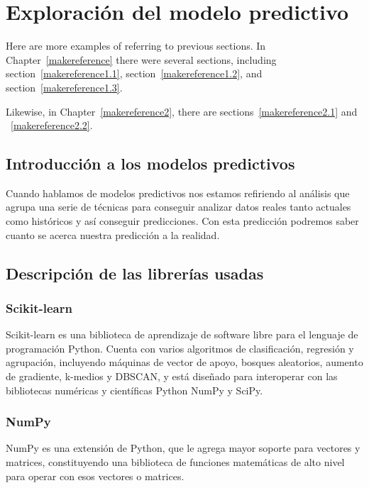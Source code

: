 
\cleardoublepage

\chapter{Exploración del modelo predictivo}
\label{makereference3}

Here are more examples of referring to previous sections.  In
Chapter~\ref{makereference} there were several sections, including
section~\ref{makereference1.1}, section~\ref{makereference1.2},
and section~\ref{makereference1.3}.

Likewise, in Chapter~\ref{makereference2}, there are
sections~\ref{makereference2.1} and ~\ref{makereference2.2}.

\section{Introducción a los modelos predictivos}
\label{makereference3.1}

Cuando hablamos de modelos predictivos nos estamos refiriendo al análisis que agrupa una serie de técnicas para conseguir analizar datos reales tanto actuales como históricos y así conseguir predicciones. Con esta predicción podremos saber cuanto se acerca nuestra predicción a la realidad.

\section{Descripción de las librerías usadas}
\label{makereference3.2}
	\subsection{Scikit-learn}
	Scikit-learn es una biblioteca de aprendizaje de software libre para el lenguaje de programación Python. Cuenta con varios algoritmos de clasificación, regresión y agrupación, incluyendo máquinas de vector de apoyo, bosques aleatorios, aumento de gradiente, k-medios y DBSCAN, y está diseñado para interoperar con las bibliotecas numéricas y científicas Python NumPy y SciPy.
	
	\subsection{NumPy}
	NumPy es una extensión de Python, que le agrega mayor soporte para vectores y matrices, constituyendo una biblioteca de funciones matemáticas de alto nivel para operar con esos vectores o matrices.
	
